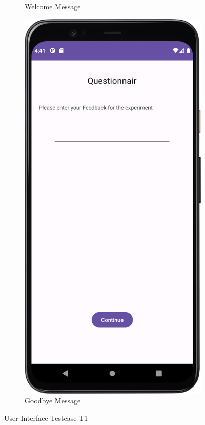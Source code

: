 \begin{figure}[htbp]
\begin{subfigure}[b]{0.3\textwidth}
        \caption{Welcome Message}
        \label{subfig:welcomeMessage}
    \end{subfigure}
    \hspace{1cm}
    \begin{subfigure}[b]{0.3\textwidth}
        \centering
        \includegraphics[width=\textwidth]{content/07_evaluation_of_the_solution/Screenshot_T2b.png}
        \caption{Goodbye Message}
        \label{subfig:goodbyeMessage}
    \end{subfigure}
    \caption{User Interface Testcase T1}
    \label{fig:T1}
\end{figure}

